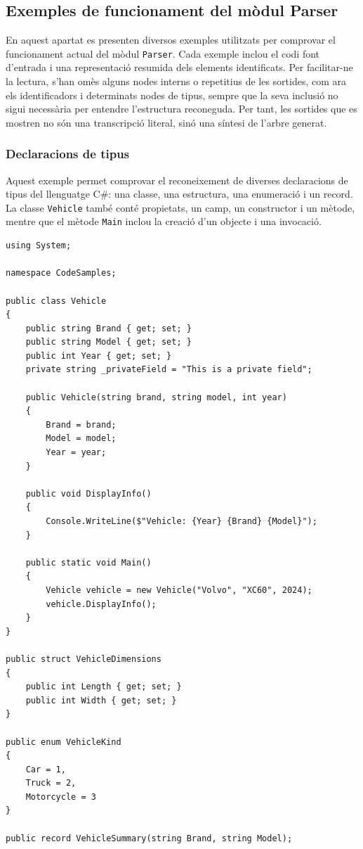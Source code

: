 \subsection*{Exemples de funcionament del mòdul Parser}
\label{sec:parser-code-examples}

En aquest apartat es presenten diversos exemples utilitzats per comprovar el
funcionament actual del mòdul \texttt{Parser}. Cada exemple inclou el codi font
d'entrada i una representació resumida dels elements identificats. Per facilitar-ne
la lectura, s'han omès alguns nodes interns o repetitius de les sortides, com ara
els identificadors i determinats nodes de tipus, sempre que la seva inclusió no
sigui necessària per entendre l'estructura reconeguda. Per tant, les sortides que
es mostren no són una transcripció literal, sinó una síntesi de l'arbre generat.

\subsubsection*{Declaracions de tipus}
\label{sec:parser-type-declarations}

Aquest exemple permet comprovar el reconeixement de diverses declaracions de tipus
del llenguatge C\#: una classe, una estructura, una enumeració i un record. La
classe \texttt{Vehicle} també conté propietats, un camp, un constructor i un mètode,
mentre que el mètode \texttt{Main} inclou la creació d'un objecte i una invocació.

\begin{lstlisting}[style=code,
    caption={Fragment del fitxer TypeDeclarationsExample.cs},
    label={lst:type-declarations-source}]
using System;

namespace CodeSamples;

public class Vehicle
{
    public string Brand { get; set; }
    public string Model { get; set; }
    public int Year { get; set; }
    private string _privateField = "This is a private field";

    public Vehicle(string brand, string model, int year)
    {
        Brand = brand;
        Model = model;
        Year = year;
    }

    public void DisplayInfo()
    {
        Console.WriteLine($"Vehicle: {Year} {Brand} {Model}");
    }

    public static void Main()
    {
        Vehicle vehicle = new Vehicle("Volvo", "XC60", 2024);
        vehicle.DisplayInfo();
    }
}

public struct VehicleDimensions
{
    public int Length { get; set; }
    public int Width { get; set; }
}

public enum VehicleKind
{
    Car = 1,
    Truck = 2,
    Motorcycle = 3
}

public record VehicleSummary(string Brand, string Model);
\end{lstlisting}

